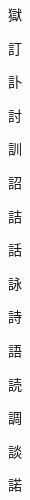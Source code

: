 \begin{spacing}{2.5}
{\Huge \begin{CJK}{UTF8}{min} 獄\end{CJK}}\hspace{0.1cm}
{\Huge \begin{CJK}{UTF8}{min} 訂\end{CJK}}\hspace{0.1cm}
{\Huge \begin{CJK}{UTF8}{min} 訃\end{CJK}}\hspace{0.1cm}
{\Huge \begin{CJK}{UTF8}{min} 討\end{CJK}}\hspace{0.1cm}
{\Huge \begin{CJK}{UTF8}{min} 訓\end{CJK}}\hspace{0.1cm}
{\Huge \begin{CJK}{UTF8}{min} 詔\end{CJK}}\hspace{0.1cm}
{\Huge \begin{CJK}{UTF8}{min} 詰\end{CJK}}\hspace{0.1cm}
{\Huge \begin{CJK}{UTF8}{min} 話\end{CJK}}\hspace{0.1cm}
{\Huge \begin{CJK}{UTF8}{min} 詠\end{CJK}}\hspace{0.1cm}
{\Huge \begin{CJK}{UTF8}{min} 詩\end{CJK}}\hspace{0.1cm}
{\Huge \begin{CJK}{UTF8}{min} 語\end{CJK}}\hspace{0.1cm}
{\Huge \begin{CJK}{UTF8}{min} 読\end{CJK}}\hspace{0.1cm}
{\Huge \begin{CJK}{UTF8}{min} 調\end{CJK}}\hspace{0.1cm}
{\Huge \begin{CJK}{UTF8}{min} 談\end{CJK}}\hspace{0.1cm}
{\Huge \begin{CJK}{UTF8}{min} 諾\end{CJK}}\hspace{0.1cm}

\end{spacing}
